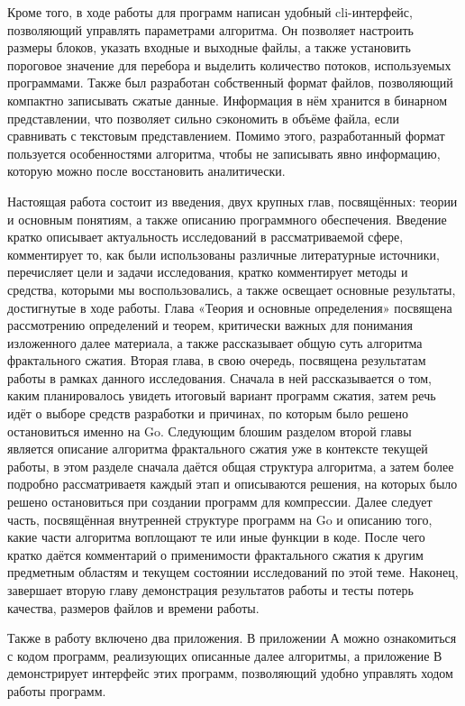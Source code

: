 \documentclass[bachelor,paper]{pmk-graduate}
\theoremstyle{definition}
\begin{document}
\results

Кроме того, в ходе работы для программ написан удобный cli-интерфейс, позволяющий управлять параметрами алгоритма. Он позволяет настроить размеры блоков, указать входные и выходные файлы, а также установить пороговое значение для перебора и выделить количество потоков, используемых программами. Также был разработан собственный формат файлов, позволяющий компактно записывать сжатые данные. Информация в нём хранится в бинарном представлении, что позволяет сильно сэкономить в объёме файла, если сравнивать с текстовым представлением. Помимо этого, разработанный формат пользуется особенностями алгоритма, чтобы не записывать явно информацию, которую можно после восстановить аналитически.

\structure
Настоящая работа состоит из введения, двух крупных глав, посвящённых: теории и основным понятиям, а также описанию программного обеспечения. Введение кратко описывает актуальность исследований в рассматриваемой сфере, комментирует то, как были использованы различные литературные источники, перечисляет цели и задачи исследования, кратко комментирует методы и средства, которыми мы воспользовались, а также освещает основные результаты, достигнутые в ходе работы. Глава «Теория и основные определения» посвящена рассмотрению определений и теорем, критически важных для понимания изложенного далее материала, а также рассказывает общую суть алгоритма фрактального сжатия. Вторая глава, в свою очередь, посвящена результатам работы в рамках данного исследования. Сначала в ней рассказывается о том, каким планировалось увидеть итоговый вариант программ сжатия, затем речь идёт о выборе средств разработки и причинах, по которым было решено остановиться именно на Go. Следующим блошим разделом второй главы является описание алгоритма фрактального сжатия уже в контексте текущей работы, в этом разделе сначала даётся общая структура алгоритма, а затем более подробно рассматриваетя каждый этап и описываются решения, на которых было решено остановиться при создании программ для компрессии. Далее следует часть, посвящённая внутренней структуре программ на Go и описанию того, какие части алгоритма воплощают те или иные функции в коде. После чего кратко даётся комментарий о применимости фрактального сжатия к другим предметным областям и текущем состоянии исследований по этой теме. Наконец, завершает вторую главу демонстрация результатов работы и тесты потерь качества, размеров файлов и времени работы.

Также в работу включено два приложения. В приложении А можно ознакомиться с кодом программ, реализующих описанные далее алгоритмы, а приложение В демонстрирует интерфейс этих программ, позволяющий удобно управлять ходом работы программ.
\end{document}

